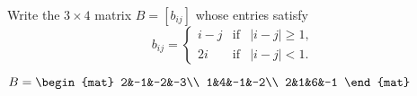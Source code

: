 \begin{Exercise}[
name={},
title={}, 
difficulty=0,
origin={\cite{MB}}]
Write the $3 \times 4$ matrix $B=[b_{ij}]$ whose entries satisfy 
\[ b_{ij} = \left\lbrace
								\begin{array}{lll}
											i-j & \mathrm{if} & |i-j|\geq1,\\
											2i    & \mathrm{if} & |i-j|< 1. 
								\end{array}\right. 
\]
\end{Exercise}

\begin{Answer}
$B=\begin{mat} 2&-1&-2&-3\\  1&4&-1&-2\\  2&1&6&-1 \end{mat}$
\end{Answer}
